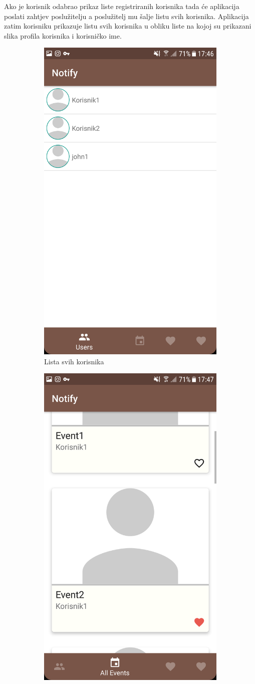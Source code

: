\documentclass[times, utf8, zavrsni]{fer}
\begin{document}
{Ako je korisnik odabrao prikaz liste registriranih korisnika tada će aplikacija poslati zahtjev poslužitelju a poslužitelj mu šalje listu svih korisnika. Aplikacija zatim korisniku prikazuje listu svih korisnika u obliku liste na kojoj su prikazani slika profila korisnika i korisničko ime.

\begin{figure}
\centering

\begin{subfigure}{0.5\linewidth}
	\centering
    \includegraphics[width=0.45\linewidth]{img/ss-user-list.png} 
    \caption{Lista svih korisnika}
    \label{fig:user-list-image}
\end{subfigure}%
\begin{subfigure}{0.5\linewidth}
 	\centering
    \includegraphics[width=0.45\linewidth]{img/ss-event-list-all.png} 

\end{subfigure}
\end{figure}}
\end{document}
